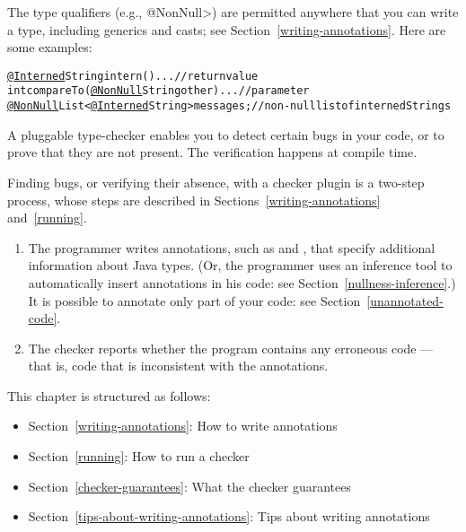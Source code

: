 The type qualifiers (e.g., \<@NonNull>) are permitted anywhere
that you can write a type, including generics and casts; see
Section~\ref{writing-annotations}.  Here are some examples:

\begin{alltt}
  \underline{@Interned} String intern() \ttlcb{} ... \ttrcb{}             // return value
  int compareTo(\underline{@NonNull} String other) \ttlcb{} ... \ttrcb{}  // parameter
  \underline{@NonNull} List<\underline{@Interned} String> messages;     // non-null list of interned Strings
\end{alltt}


\htmlhr
{}

A pluggable type-checker enables you to detect certain bugs in your code,
or to prove that they are not present.  The verification happens at compile
time.


Finding bugs, or verifying their absence, with a checker plugin is a two-step process, whose steps are
described in Sections~\ref{writing-annotations} and~\ref{running}.

\begin{enumerate}

\item The programmer writes annotations, such as  and
  , that specify additional information about Java types.
  (Or, the programmer uses an inference tool to automatically insert
  annotations in his code:  see Section~\ref{nullness-inference}.)
  It is possible to annotate only part of your code:  see
  Section~\ref{unannotated-code}.

\item The checker reports whether the program contains any erroneous code
  --- that is, code that is inconsistent with the annotations.

\end{enumerate}

This chapter is structured as follows:
\begin{itemize}
\item Section~\ref{writing-annotations}: How to write annotations
\item Section~\ref{running}:  How to run a checker
\item Section~\ref{checker-guarantees}: What the checker guarantees
\item Section~\ref{tips-about-writing-annotations}: Tips about writing annotations
\end{itemize}

